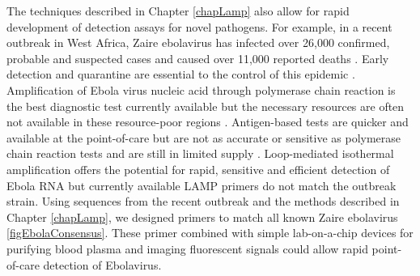 \documentclass[../sherrill-Mix_thesis.tex]{subfiles}
\begin{document}
		The techniques described in Chapter \ref{chapLamp} also allow for rapid development of detection assays for novel pathogens. For example, in a recent outbreak in West Africa, Zaire ebolavirus has infected over 26,000 confirmed, probable and suspected cases and caused over 11,000 reported deaths \citep{Gire2014,WHOERT2014,WHO2015}. Early detection and quarantine are essential to the control of this epidemic \citep{Chowell2014}. Amplification of Ebola virus nucleic acid through polymerase chain reaction is the best diagnostic test currently available but the necessary resources are often not available in these resource-poor regions \citep{Fauci2014,WHO2015a}. Antigen-based tests are quicker and available at the point-of-care but are not as accurate or sensitive as polymerase chain reaction tests and are still in limited supply \citep{WHO2015a}.  Loop-mediated isothermal amplification offers the potential for rapid, sensitive and efficient detection of Ebola RNA but currently available LAMP primers \citep{Kurosaki2007} do not match the outbreak strain. Using sequences from the recent outbreak \citep{Gire2014,Hoenen2015} and the methods described in Chapter \ref{chapLamp}, we designed primers to match all known Zaire ebolavirus \ref{figEbolaConsensus}. These primer combined with simple lab-on-a-chip devices for purifying blood plasma \citep{Liu2013} and imaging fluorescent signals \citep{Liu2011,Liu2014a} could allow rapid point-of-care detection of Ebolavirus.
\end{document}
